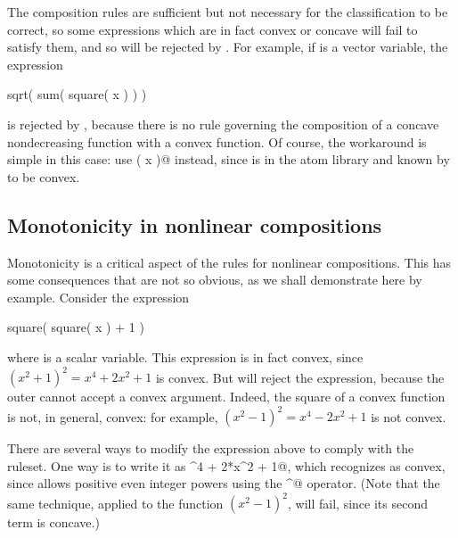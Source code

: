 \documentclass[12pt]{article}
\begin{document}
The composition rules are sufficient but not necessary for
the classification to be correct,
so some expressions which are in fact convex or concave will fail to
satisfy them, and so will be rejected by \cvx.
For example, if \verb@x@ is a vector variable, the
expression
\begin{code}
	sqrt( sum( square( x ) ) )
\end{code}
is rejected by \cvx, because there is no rule governing the composition
of a concave nondecreasing function with a convex function.
Of course, the workaround is simple in this case: use \verb@norm( x )@ instead,
since \verb@norm@ is in the atom library and known by \cvx to be convex.

\subsection{Monotonicity in nonlinear compositions}

Monotonicity is a critical aspect of the rules for nonlinear compositions. 
This has some consequences that are not so obvious, as we shall demonstrate here
by example. Consider the expression
\begin{code}
	square( square( x ) + 1 )
\end{code}
where \verb@x@ is a scalar variable.
This expression is in fact convex, since
$(x^2+1)^2 = x^4+2x^2+1$ is convex.
But \cvx will reject the expression, because the outer \verb@square@
cannot accept a convex argument.  Indeed, the square of a convex function
is not, in general, convex: for example, $(x^2-1)^2 = x^4-2x^2+1$ is
not convex.

There are several ways to modify the expression above to
comply with the ruleset.
One way is to write it as \verb@x^4 + 2*x^2 + 1@,
which \cvx recognizes as convex, since
\cvx allows positive even integer powers using the \verb@^@ operator.
(Note that the same technique, applied to the function $(x^2-1)^2$,
will fail, since its second term is concave.)
\end{document}
